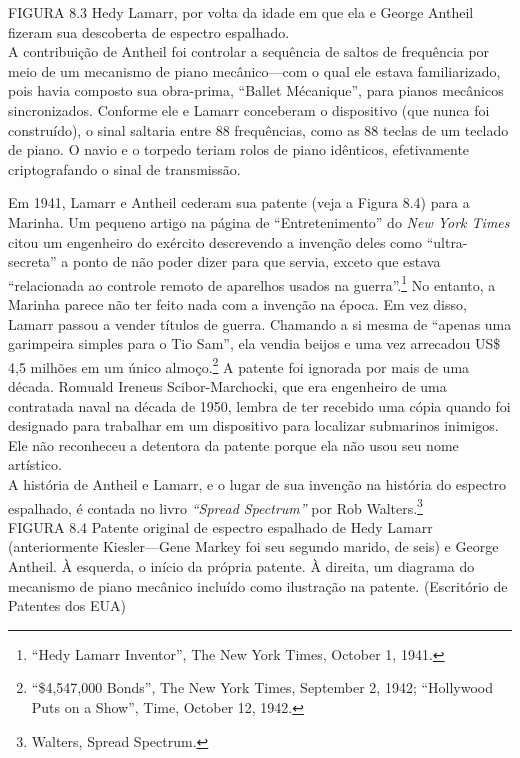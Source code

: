 \documentclass{book}
\newcommand{\ingles}[1]{\textit{#1}}
\begin{document}
FIGURA 8.3 Hedy Lamarr, por volta da idade em que ela e George Antheil fizeram
sua descoberta de espectro espalhado.\\

A contribuição de Antheil foi controlar a sequência de saltos de frequência por
meio de um mecanismo de piano mecânico---com o qual ele estava familiarizado,
pois havia composto sua obra-prima, ``Ballet Mécanique'', para pianos mecânicos
sincronizados. Conforme ele e Lamarr conceberam o dispositivo (que nunca foi
construído), o sinal saltaria entre 88 frequências, como as 88 teclas de um
teclado de piano. O navio e o torpedo teriam rolos de piano idênticos,
efetivamente criptografando o sinal de transmissão.

Em 1941, Lamarr e Antheil cederam sua patente (veja a Figura 8.4) para a Marinha.
Um pequeno artigo na página de ``Entretenimento'' do \ingles{New York Times}
citou um engenheiro do exército descrevendo a invenção deles como ``ultra-secreta''
a ponto de não poder dizer para que servia, exceto que estava ``relacionada ao
controle remoto de aparelhos usados na guerra''.\footnote{``Hedy Lamarr Inventor'',
The New York Times, October 1, 1941.} No entanto, a Marinha parece não ter feito
nada com a invenção na época. Em vez disso, Lamarr passou a vender títulos de
guerra. Chamando a si mesma de ``apenas uma garimpeira simples para o Tio Sam'',
ela vendia beijos e uma vez arrecadou US\$ 4,5 milhões em um único
almoço.\footnote{``\$4,547,000 Bonds'', The New York Times, September 2, 1942;
``Hollywood Puts on a Show'', Time, October 12, 1942.} A patente foi ignorada
por mais de uma década. Romuald Ireneus Scibor-Marchocki, que era engenheiro de
uma contratada naval na década de 1950, lembra de ter recebido uma cópia quando
foi designado para trabalhar em um dispositivo para localizar submarinos inimigos.
Ele não reconheceu a detentora da patente porque ela não usou seu nome artístico.\\

A história de Antheil e Lamarr, e o lugar de sua invenção na história do espectro
espalhado, é contada no livro \ingles{``Spread Spectrum''} por Rob
Walters.\footnote{Walters, Spread Spectrum.}\\

FIGURA 8.4 Patente original de espectro espalhado de Hedy Lamarr (anteriormente
Kiesler---Gene Markey foi seu segundo marido, de seis) e George Antheil. À
esquerda, o início da própria patente. À direita, um diagrama do mecanismo de
piano mecânico incluído como ilustração na patente. (Escritório de Patentes dos
EUA)\\
\end{document}
